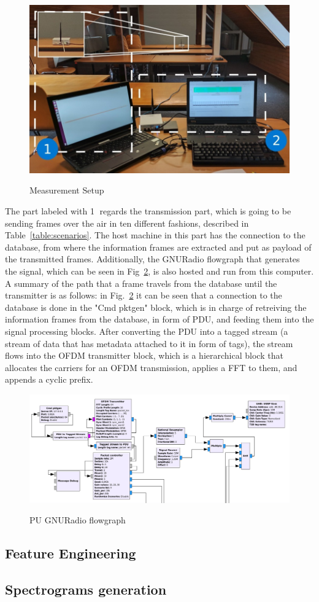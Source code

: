 \begin{figure}[!htb]
    \centering
    \includegraphics[width=0.5\linewidth]{figures/mod}
    \label{fig:measurement}
    \caption{Measurement Setup}
\end{figure}

The part labeled with \textcircled{1} regards the transmission part, which is going to be sending frames over the air in ten different fashions, described in Table~\ref{table:scenarios}.  The host machine in this part has the connection to the database, from where the information frames are extracted and put as payload of the transmitted frames. Additionally, the GNURadio flowgraph that generates the signal, which can be seen in Fig~\ref{fig:PU_flowgraph}, is also hosted and run from this computer. A summary of the path that a frame travels from the database until the transmitter is as follows: in Fig.~\ref{fig:PU_flowgraph} it can be seen that a connection to the database is done in the "Cmd pktgen" block, which is in charge of retreiving the information frames from the database, in form of \ac{PDU}, and feeding them into the signal processing blocks. After converting the \ac{PDU} into a tagged stream (a stream of data that has metadata attached to it in form of tags), the stream flows into the \ac{OFDM} transmitter block, which is a hierarchical block that allocates the carriers for an \ac{OFDM} transmission, applies a \ac{FFT} to them, and appends a cyclic prefix.

\begin{figure}[!htb]
    \centering
    \includegraphics[width=\textwidth]{figures/PU_flowgraph}
    \label{fig:PU_flowgraph}
    \caption{\ac{PU} GNURadio flowgraph}
\end{figure}

\subsection{Feature Engineering}\label{ch:features}
\subsection{Spectrograms generation}
